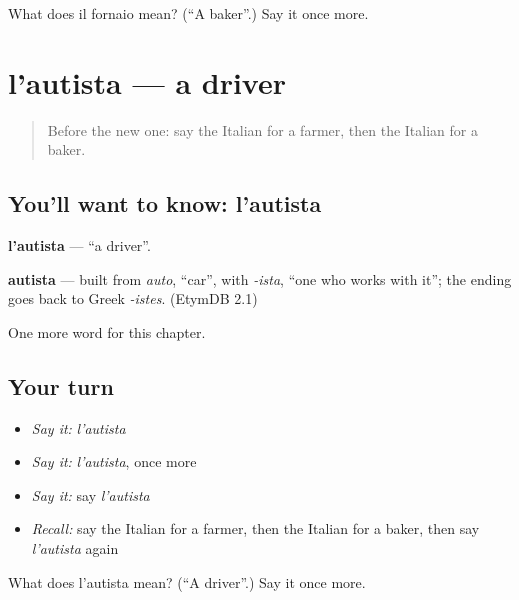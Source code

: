 \begin{tcolorbox}[breakable,colback=teal!4,colframe=teal!35!black,title={Before you move on}]
What does il fornaio mean? (\textquotedblleft{}A baker\textquotedblright{}.) Say it once more.
\end{tcolorbox}
\section[l'autista]{l'autista — a driver}

\label{lesson:IT-C112-autista}



\begin{quote}
Before the new one: say the Italian for a farmer, then the Italian for a baker.
\end{quote}

\subsection*{You'll want to know: l'autista}
\textbf{l'autista} — \textquotedblleft{}a driver\textquotedblright{}.

\begin{cousinweb}
\textbf{autista} — built from \emph{auto}, \textquotedblleft{}car\textquotedblright{}, with \emph{-ista}, \textquotedblleft{}one who works with it\textquotedblright{}; the ending goes back to Greek \emph{-istes}. (EtymDB 2.1)
\end{cousinweb}

\begin{grammarlens}[title={What you've built}]
One more word for this chapter.
\end{grammarlens}

\subsection*{Your turn}
\begin{itemize}
\raggedright
  \item \emph{Say it:} \emph{l'autista}
  \item \emph{Say it:} \emph{l'autista}, once more
  \item \emph{Say it:} say \emph{l'autista}
  \item \emph{Recall:} say the Italian for a farmer, then the Italian for a baker, then say \emph{l'autista} again
\end{itemize}

\begin{tcolorbox}[breakable,colback=teal!4,colframe=teal!35!black,title={Before you move on}]
What does l'autista mean? (\textquotedblleft{}A driver\textquotedblright{}.) Say it once more.
\end{tcolorbox}
